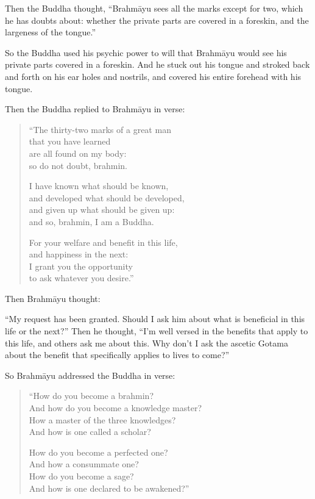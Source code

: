 \documentclass[12pt,openany]{book}%
\begin{document}
Then the Buddha thought, “\textsanskrit{Brahmāyu} sees all the marks except for two, which he has doubts about: whether the private parts are covered in a foreskin, and the largeness of the tongue.” 

So the Buddha used his psychic power to will that \textsanskrit{Brahmāyu} would see his private parts covered in a foreskin. And he stuck out his tongue and stroked back and forth on his ear holes and nostrils, and covered his entire forehead with his tongue. 

Then the Buddha replied to \textsanskrit{Brahmāyu} in verse: 

\begin{verse}%
“The thirty-two marks of a great man \\
that you have learned \\
are all found on my body: \\
so do not doubt, brahmin. 

I have known what should be known, \\
and developed what should be developed, \\
and given up what should be given up: \\
and so, brahmin, I am a Buddha. 

For your welfare and benefit in this life, \\
and happiness in the next: \\
I grant you the opportunity \\
to ask whatever you desire.” 

%
\end{verse}

Then \textsanskrit{Brahmāyu} thought: 

“My request has been granted. Should I ask him about what is beneficial in this life or the next?” Then he thought, “I’m well versed in the benefits that apply to this life, and others ask me about this. Why don’t I ask the ascetic Gotama about the benefit that specifically applies to lives to come?” 

So \textsanskrit{Brahmāyu} addressed the Buddha in verse: 

\begin{verse}%
“How do you become a brahmin? \\
And how do you become a knowledge master? \\
How a master of the three knowledges? \\
And how is one called a scholar? 

How do you become a perfected one? \\
And how a consummate one? \\
How do you become a sage? \\
And how is one declared to be awakened?” 

%
\end{verse}
\end{document}
